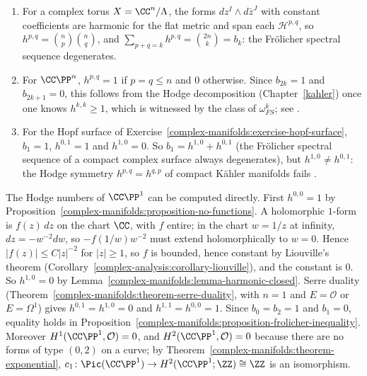 \begin{example}\label{complex-manifolds:example-hodge-numbers}
\begin{enumerate}
\item For a complex torus $X = \CC^n/\Lambda$, the forms $dz^I \wedge d\bar z^J$ with constant coefficients are harmonic for the flat metric and span each $\mathcal{H}^{p,q}$, so
$h^{p,q} = \binom{n}{p}\binom{n}{q}$, and $\sum_{p+q=k}h^{p,q} = \binom{2n}{k} = b_k$: the Fr\"olicher spectral sequence degenerates.
\item For $\CC\PP^n$, $h^{p,q} = 1$ if $p = q \leq n$ and $0$ otherwise. Since $b_{2k} = 1$ and $b_{2k+1} = 0$, this follows from the Hodge decomposition (Chapter~\ref{kahler}) once one knows
$h^{k,k} \geq 1$, which is witnessed by the class of $\omega_{FS}^k$; see \cite[Chapter 0, Section 7]{griffiths-harris}.
\item For the Hopf surface of Exercise~\ref{complex-manifolds:exercise-hopf-surface}, $b_1 = 1$, $h^{0,1} = 1$ and $h^{1,0} = 0$. So $b_1 = h^{1,0} + h^{0,1}$ (the Fr\"olicher spectral sequence of a compact
complex surface always degenerates), but $h^{1,0} \neq h^{0,1}$: the Hodge symmetry $h^{p,q} = h^{q,p}$ of compact K\"ahler manifolds fails \cite[Chapter IV]{bhpv}.
\end{enumerate}
\end{example}

\begin{example}\label{complex-manifolds:example-riemann-sphere}
The Hodge numbers of $\CC\PP^1$ can be computed directly. First $h^{0,0} = 1$ by Proposition~\ref{complex-manifolds:proposition-no-functions}. A holomorphic $1$-form is $f(z)\,dz$ on the chart $\CC$, with $f$
entire; in the chart $w = 1/z$ at infinity, $dz = -w^{-2}dw$, so $-f(1/w)w^{-2}$ must extend holomorphically to $w = 0$. Hence $|f(z)| \leq C|z|^{-2}$ for $|z| \geq 1$, so $f$ is bounded, hence constant by
Liouville's theorem (Corollary~\ref{complex-analysis:corollary-liouville}), and the constant is $0$. So $h^{1,0} = 0$ by Lemma~\ref{complex-manifolds:lemma-harmonic-closed}. Serre duality
(Theorem~\ref{complex-manifolds:theorem-serre-duality}, with $n = 1$ and $E = \mathcal{O}$ or $E = \Omega^1$) gives $h^{0,1} = h^{1,0} = 0$ and $h^{1,1} = h^{0,0} = 1$. Since $b_0 = b_2 = 1$ and $b_1 = 0$, equality
holds in Proposition~\ref{complex-manifolds:proposition-frolicher-inequality}. Moreover $H^1(\CC\PP^1, \mathcal{O}) = 0$, and $H^2(\CC\PP^1, \mathcal{O}) = 0$ because there are no forms of type $(0,2)$ on a curve; by
Theorem~\ref{complex-manifolds:theorem-exponential}, $c_1 \colon \Pic(\CC\PP^1) \to H^2(\CC\PP^1; \ZZ) \cong \ZZ$ is an isomorphism.
\end{example}

